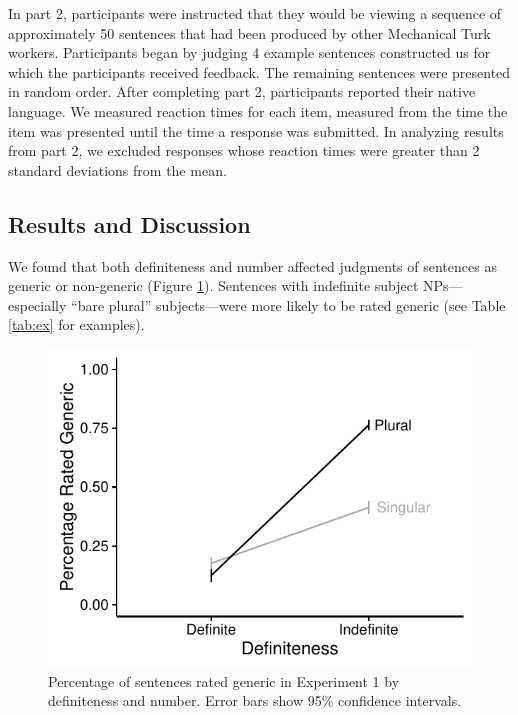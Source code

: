 \documentclass[10pt,letterpaper]{article}
\begin{document}
In part 2, participants were instructed that they would be viewing a sequence of approximately 50 sentences that had been produced by other Mechanical Turk workers. Participants began by judging 4 example sentences constructed us for which the participants received feedback. The remaining sentences were presented in random order. After completing part 2, participants reported their native language. We measured reaction times for each item, measured from the time the item was presented until the time a response was submitted.  In analyzing results from part 2, we excluded responses whose reaction times were greater than 2 standard deviations from the mean.


\subsection{Results and Discussion}

We found that both definiteness and number affected judgments of sentences as generic or non-generic (Figure \ref{fig:e2}). Sentences with indefinite subject NPs---especially ``bare plural'' subjects---were more likely to be rated generic (see Table \ref{tab:ex} for examples).

\begin{figure}[t]
\centering
\includegraphics[width=.8\linewidth]{figures/e2-2016.pdf}
\caption{\label{fig:e2} Percentage of sentences rated generic in Experiment 1 by definiteness and number. Error bars show 95\% confidence intervals.} 
\end{figure}
\end{document}
